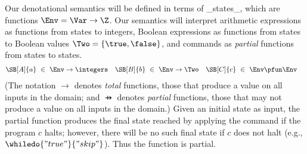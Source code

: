 Our denotational semantics will be defined in terms of _states_, which are functions $\Env = \Var \to \Z$. Our semantics will interpret arithmetic expressions as functions from states to integers, Boolean expressions as functions from states to Boolean values $\Two = \{\true,\false\}$, and commands as \emph{partial} functions from states to states.
\begin{align*}
\SB[A]{a}\ &\in\ \Env \to \integers &
\SB[B]{b}\ &\in\ \Env \to \Two &
\SB[C]{c}\ &\in\ \Env \pfun \Env
\end{align*}
(The notation $\to$ denotes \emph{total} functions, those that produce a value on all inputs in the domain; and $\pfun$ denotes \emph{partial} functions, those that may not produce a value on all inputs in the domain.)
Given an initial state as input, the partial function  produces the final state reached by applying the command if the program $c$ halts; however, there will be no such final state if $c$ does not halt (e.g., $\whiledo{"true"}{"skip"}$). Thus the function is partial.

